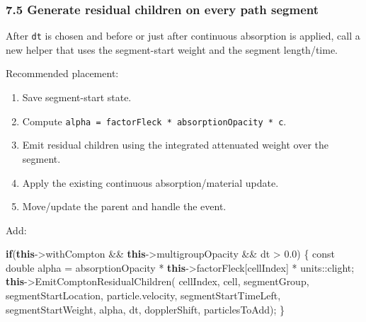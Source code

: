 \documentclass[
]{article}
\newenvironment{Shaded}{}{}
\newcommand{\AttributeTok}[1]{\textcolor[rgb]{0.49,0.56,0.16}{#1}}
\newcommand{\ControlFlowTok}[1]{\textcolor[rgb]{0.00,0.44,0.13}{\textbf{#1}}}
\newcommand{\DataTypeTok}[1]{\textcolor[rgb]{0.56,0.13,0.00}{#1}}
\newcommand{\FloatTok}[1]{\textcolor[rgb]{0.25,0.63,0.44}{#1}}
\newcommand{\KeywordTok}[1]{\textcolor[rgb]{0.00,0.44,0.13}{\textbf{#1}}}
\newcommand{\NormalTok}[1]{#1}
\newcommand{\OperatorTok}[1]{\textcolor[rgb]{0.40,0.40,0.40}{#1}}
\providecommand{\tightlist}{%
  \setlength{\itemsep}{0pt}\setlength{\parskip}{0pt}}
\begin{document}
\subsubsection{7.5 Generate residual children on every path
segment}\label{generate-residual-children-on-every-path-segment}

After \texttt{dt} is chosen and before or just after continuous
absorption is applied, call a new helper that uses the segment-start
weight and the segment length/time.

Recommended placement:

\begin{enumerate}
\def\labelenumi{\arabic{enumi}.}
\tightlist
\item
  Save segment-start state.
\item
  Compute \texttt{alpha\ =\ factorFleck\ *\ absorptionOpacity\ *\ c}.
\item
  Emit residual children using the integrated attenuated weight over the
  segment.
\item
  Apply the existing continuous absorption/material update.
\item
  Move/update the parent and handle the event.
\end{enumerate}

Add:

\begin{Shaded}
\begin{Highlighting}[]
\ControlFlowTok{if}\OperatorTok{(}\KeywordTok{this}\OperatorTok{{-}\textgreater{}}\NormalTok{withCompton }\OperatorTok{\&\&} \KeywordTok{this}\OperatorTok{{-}\textgreater{}}\NormalTok{multigroupOpacity }\OperatorTok{\&\&}\NormalTok{ dt }\OperatorTok{\textgreater{}} \FloatTok{0.0}\OperatorTok{)}
\OperatorTok{\{}
    \AttributeTok{const} \DataTypeTok{double}\NormalTok{ alpha }\OperatorTok{=}\NormalTok{ absorptionOpacity }\OperatorTok{*} \KeywordTok{this}\OperatorTok{{-}\textgreater{}}\NormalTok{factorFleck}\OperatorTok{[}\NormalTok{cellIndex}\OperatorTok{]} \OperatorTok{*}\NormalTok{ units}\OperatorTok{::}\NormalTok{clight}\OperatorTok{;}
    \KeywordTok{this}\OperatorTok{{-}\textgreater{}}\NormalTok{EmitComptonResidualChildren}\OperatorTok{(}
\NormalTok{        cellIndex}\OperatorTok{,}
\NormalTok{        cell}\OperatorTok{,}
\NormalTok{        segmentGroup}\OperatorTok{,}
\NormalTok{        segmentStartLocation}\OperatorTok{,}
\NormalTok{        particle}\OperatorTok{.}\NormalTok{velocity}\OperatorTok{,}
\NormalTok{        segmentStartTimeLeft}\OperatorTok{,}
\NormalTok{        segmentStartWeight}\OperatorTok{,}
\NormalTok{        alpha}\OperatorTok{,}
\NormalTok{        dt}\OperatorTok{,}
\NormalTok{        dopplerShift}\OperatorTok{,}
\NormalTok{        particlesToAdd}\OperatorTok{);}
\OperatorTok{\}}
\end{Highlighting}
\end{Shaded}
\end{document}
